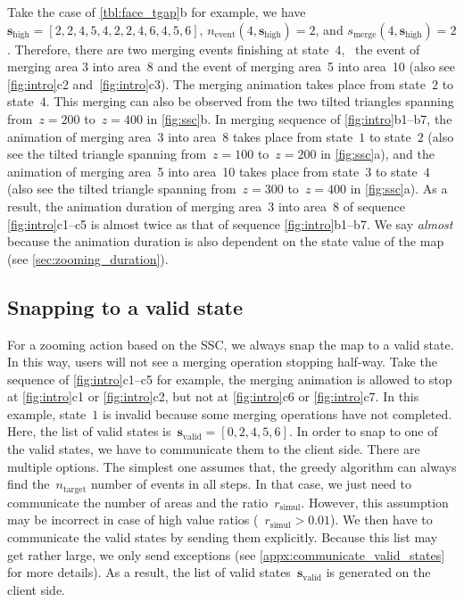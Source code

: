 \documentclass[twocolumn]{svjour3}          %
\begin{document}
Take the case of \tabl\ref{tbl:face_tgap}b for example,
we have~$\mathrm{\textbf{s}_{high}} 
= [2, 2, 4, 5, 4, 2, 2, 4, 6, 4, 5, 6]$, 
$n_\mathrm{event} (4, \mathrm{\textbf{s}_{high}}) = 2$, 
and $s_\mathrm{merge} (4, \mathrm{\textbf{s}_{high}}) = 2$.
Therefore, there are two merging events finishing at state~$4$,
\ie~the event of merging area 3 into area~8 and 
the event of merging area~5 into area~10 
(also see \figs\ref{fig:intro}c2 and~\ref{fig:intro}c3).
The merging animation takes place from state~$2$ to state~$4$.
This merging can also be observed from 
the two tilted triangles spanning from~$z = 200$ to~$z = 400$ 
in \fig\ref{fig:ssc}b.
In merging sequence of \figs\ref{fig:intro}b1--b7, 
the animation of merging area~3 into area~8 
takes place from state~$1$ to state~$2$
(also see the tilted triangle spanning from~$z = 100$ to~$z = 200$ 
in \fig\ref{fig:ssc}a), and 
the animation of merging area~5 into area~10
takes place from state~$3$ to state~$4$
(also see the tilted triangle spanning from~$z = 300$ to~$z = 400$ 
in \fig\ref{fig:ssc}a).
As a result, the animation duration of merging area~3 into area~8 of 
sequence \figs\ref{fig:intro}c1--c5
is almost twice as that of sequence \figs\ref{fig:intro}b1--b7.
We say \emph{almost} because the animation duration is also dependent on 
the state value of the map
(see \sect\ref{sec:zooming_duration}).


\subsection{Snapping to a valid state}
\label{sec:snap}

For a zooming action based on the SSC, 
we always snap the map to a valid state.
In this way, users will not see a merging operation stopping half-way.
Take the sequence of \figs\ref{fig:intro}c1--c5 for example, 
the merging animation is allowed to stop at 
\ref{fig:intro}c1 or \ref{fig:intro}c2,
but not at \ref{fig:intro}c6 or \ref{fig:intro}c7.
In this example, state~$1$ is invalid
because some merging operations have not completed.
Here, the list of valid states 
is~$\mathrm{\textbf{s}_{valid}} = [0, 2, 4, 5, 6]$.
In order to snap to one of the valid states,
we have to communicate them to the client side. 
There are multiple options. 
The simplest one assumes that, 
the greedy algorithm can always find
the~$n_\mathrm{target}$ number of events in all steps. 
In that case, we just need to communicate 
the number of areas and the ratio~$r_\mathrm{simul}$. 
However, this assumption may be incorrect in case of high value ratios (\eg~$r_\mathrm{simul} > 0.01$). 
We then have to communicate the valid states by sending them explicitly. 
Because this list may get rather large,
we only send exceptions 
(see \appx\ref{appx:communicate_valid_states} for more details).
As a result, the list of valid states~$\mathrm{\textbf{s}_{valid}}$ 
is generated on the client side.
\end{document}
